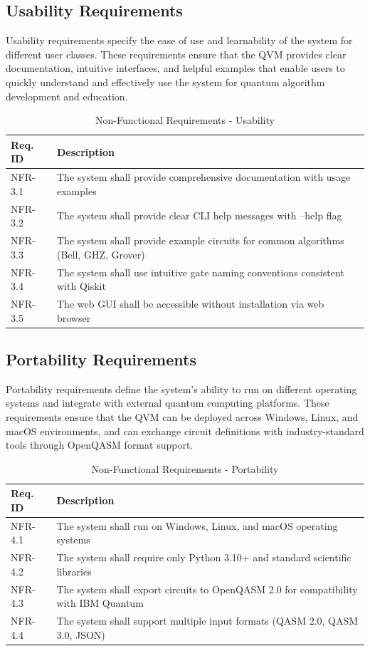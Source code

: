 \subsection{Usability Requirements}

Usability requirements specify the ease of use and learnability of the system for different user classes. These requirements ensure that the QVM provides clear documentation, intuitive interfaces, and helpful examples that enable users to quickly understand and effectively use the system for quantum algorithm development and education.

\begin{table}[H]
\centering
\caption{Non-Functional Requirements - Usability}
\begin{tabular}{|p{2cm}|p{11cm}|}
\hline
\textbf{Req. ID} & \textbf{Description} \\
\hline
NFR-3.1 & The system shall provide comprehensive documentation with usage examples \\
\hline
NFR-3.2 & The system shall provide clear CLI help messages with --help flag \\
\hline
NFR-3.3 & The system shall provide example circuits for common algorithms (Bell, GHZ, Grover) \\
\hline
NFR-3.4 & The system shall use intuitive gate naming conventions consistent with Qiskit \\
\hline
NFR-3.5 & The web GUI shall be accessible without installation via web browser \\
\hline
\end{tabular}
\end{table}

\subsection{Portability Requirements}

Portability requirements define the system's ability to run on different operating systems and integrate with external quantum computing platforms. These requirements ensure that the QVM can be deployed across Windows, Linux, and macOS environments, and can exchange circuit definitions with industry-standard tools through OpenQASM format support.

\begin{table}[H]
\centering
\caption{Non-Functional Requirements - Portability}
\begin{tabular}{|p{2cm}|p{11cm}|}
\hline
\textbf{Req. ID} & \textbf{Description} \\
\hline
NFR-4.1 & The system shall run on Windows, Linux, and macOS operating systems \\
\hline
NFR-4.2 & The system shall require only Python 3.10+ and standard scientific libraries \\
\hline
NFR-4.3 & The system shall export circuits to OpenQASM 2.0 for compatibility with IBM Quantum \\
\hline
NFR-4.4 & The system shall support multiple input formats (QASM 2.0, QASM 3.0, JSON) \\
\hline
\end{tabular}
\end{table}

